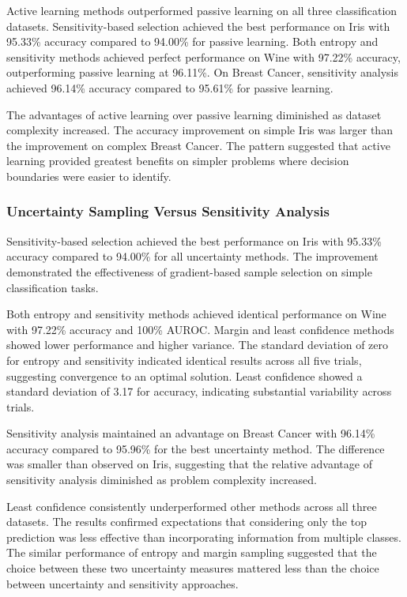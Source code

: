 \documentclass[conference]{IEEEtran}
\begin{document}
Active learning methods outperformed passive learning on all three classification datasets. Sensitivity-based selection achieved the best performance on Iris with 95.33\% accuracy compared to 94.00\% for passive learning. Both entropy and sensitivity methods achieved perfect performance on Wine with 97.22\% accuracy, outperforming passive learning at 96.11\%. On Breast Cancer, sensitivity analysis achieved 96.14\% accuracy compared to 95.61\% for passive learning.

The advantages of active learning over passive learning diminished as dataset complexity increased. The accuracy improvement on simple Iris was larger than the improvement on complex Breast Cancer. The pattern suggested that active learning provided greatest benefits on simpler problems where decision boundaries were easier to identify.

\subsubsection{Uncertainty Sampling Versus Sensitivity Analysis}

Sensitivity-based selection achieved the best performance on Iris with 95.33\% accuracy compared to 94.00\% for all uncertainty methods. The improvement demonstrated the effectiveness of gradient-based sample selection on simple classification tasks.

Both entropy and sensitivity methods achieved identical performance on Wine with 97.22\% accuracy and 100\% AUROC. Margin and least confidence methods showed lower performance and higher variance. The standard deviation of zero for entropy and sensitivity indicated identical results across all five trials, suggesting convergence to an optimal solution. Least confidence showed a standard deviation of 3.17 for accuracy, indicating substantial variability across trials.

Sensitivity analysis maintained an advantage on Breast Cancer with 96.14\% accuracy compared to 95.96\% for the best uncertainty method. The difference was smaller than observed on Iris, suggesting that the relative advantage of sensitivity analysis diminished as problem complexity increased.

Least confidence consistently underperformed other methods across all three datasets. The results confirmed expectations that considering only the top prediction was less effective than incorporating information from multiple classes. The similar performance of entropy and margin sampling suggested that the choice between these two uncertainty measures mattered less than the choice between uncertainty and sensitivity approaches.
\end{document}
